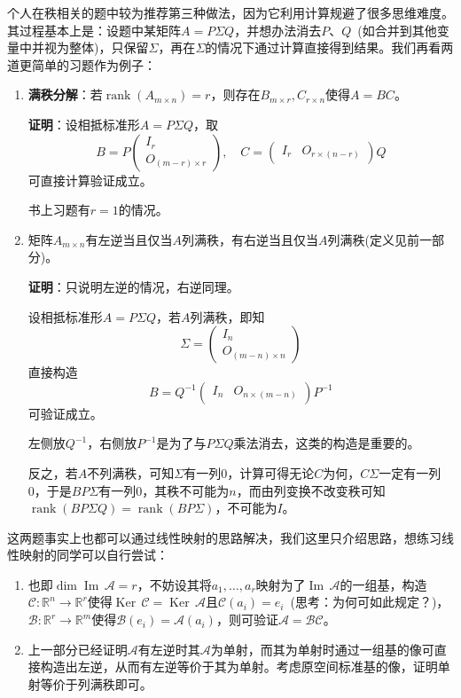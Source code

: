 \documentclass[a4paper,UTF8,fontset=windows]{ctexart}
\DeclareMathOperator{\rank}{rank}
\DeclareMathOperator{\im}{Im\,}
\DeclareMathOperator{\Ker}{Ker\,}
\newcommand*{\ma}{\mathcal{A}}
\newcommand*{\mb}{\mathcal{B}}
\newcommand*{\mc}{\mathcal{C}}
\newcommand*{\note}{\noindent *}
\begin{document}
个人在秩相关的题中较为推荐第三种做法，因为它利用计算规避了很多思维难度。其过程基本上是：设题中某矩阵$A=P\Sigma Q$，并想办法消去$P$、$Q$\ (如合并到其他变量中并视为整体)，只保留$\Sigma$，再在$\Sigma$的情况下通过计算直接得到结果。我们再看两道更简单的习题作为例子：
\begin{enumerate}
    \item \textbf{满秩分解}：若$\rank(A_{m\times n})=r$，则存在$B_{m\times r},C_{r\times n}$使得$A=BC$。
    
    \textbf{证明}：设相抵标准形$A=P\Sigma Q$，取
    $$B=P\begin{pmatrix}I_r\\O_{(m-r)\times r}\end{pmatrix},\quad C=\begin{pmatrix}I_r&O_{r\times(n-r)}\end{pmatrix}Q$$
    可直接计算验证成立。

    \note 书上习题有$r=1$的情况。

    \item 矩阵$A_{m\times n}$有左逆当且仅当$A$列满秩，有右逆当且仅当$A$列满秩(定义见前一部分)。
    
    \textbf{证明}：只说明左逆的情况，右逆同理。

    设相抵标准形$A=P\Sigma Q$，若$A$列满秩，即知
    $$\Sigma=\begin{pmatrix}I_n\\O_{(m-n)\times n}\end{pmatrix}$$
    直接构造
    $$B=Q^{-1}\begin{pmatrix}I_n&O_{n\times(m-n)}\end{pmatrix}P^{-1}$$
    可验证成立。

    \note 左侧放$Q^{-1}$，右侧放$P^{-1}$是为了与$P\Sigma Q$乘法消去，这类的构造是重要的。

    反之，若$A$不列满秩，可知$\Sigma$有一列0，计算可得无论$C$为何，$C\Sigma$一定有一列0，于是$BP\Sigma$有一列0，其秩不可能为$n$，而由列变换不改变秩可知$\rank(BP\Sigma Q)=\rank(BP\Sigma)$，不可能为$I$。
\end{enumerate}

这两题事实上也都可以通过线性映射的思路解决，我们这里只介绍思路，想练习线性映射的同学可以自行尝试：
\begin{enumerate}
    \item 也即$\dim\im\ma=r$，不妨设其将$a_1,\dots,a_r$映射为了$\im\ma$的一组基，构造$\mc:\mathbb{R}^n\to\mathbb{R}^r$使得$\Ker\mc=\Ker\ma$且$\mc(a_i)=e_i$\ (思考：为何可如此规定？)，$\mb:\mathbb{R}^r\to\mathbb{R}^m$使得$\mb(e_i)=\ma(a_i)$，则可验证$\ma=\mb\mc$。
    \item 上一部分已经证明$\ma$有左逆时其$\ma$为单射，而其为单射时通过一组基的像可直接构造出左逆，从而有左逆等价于其为单射。考虑原空间标准基的像，证明单射等价于列满秩即可。
\end{enumerate}
\end{document}
